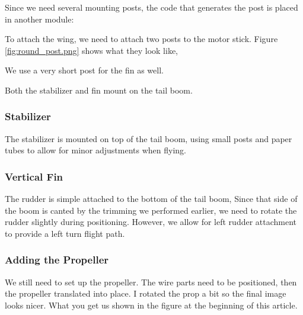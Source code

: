 Since we need several mounting posts, the code that generates the post is
placed in another module:

To attach the wing, we need to attach two posts to the motor stick. Figure
\ref{fig:round_post.png} shows what they look like,



We use a very short post for the fin as well.

Both the stabilizer and fin mount on the tail boom.

\subsubsection{Stabilizer}

The stabilizer is mounted on top of the tail boom, using small posts and paper
tubes to allow for minor adjustments when flying.

\subsubsection{Vertical Fin}

The rudder is simple attached to the bottom of the tail boom, Since that side
of the boom is canted by the trimming we performed earlier, we need to rotate
the rudder slightly during positioning.  However, we allow for  left rudder
attachment to provide a left turn flight path.

\subsubsection{Adding the Propeller}

We still need to set up the propeller. The wire parts need to be positioned,
then the propeller translated into place. I rotated the prop a bit so the final
image looks nicer. What you get us shown in the figure at the beginning of this
article.


